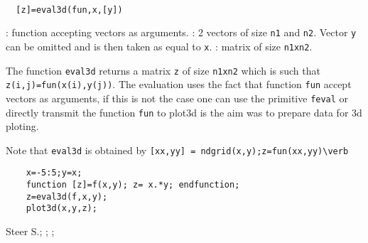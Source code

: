 \begin{mandesc}
  \\
\end{mandesc}
\begin{calling_sequence}
\begin{verbatim}
  [z]=eval3d(fun,x,[y])
\end{verbatim}
\end{calling_sequence}
\begin{parameters}
  \begin{varlist}
    : function accepting vectors as arguments.
    : 2 vectors of size \verb!n1! and \verb!n2!. Vector \verb!y! can be omitted and
    is then taken as equal to \verb!x!.
    : matrix of size \verb!n1xn2!.
  \end{varlist}
\end{parameters}
\begin{mandescription}
  The function \verb!eval3d! returns a matrix \verb!z! of size \verb!n1xn2!
  which is such that \verb!z(i,j)=fun(x(i),y(j))!. The evaluation uses
  the fact that function \verb!fun! accept vectors as arguments, if this is not
  the case one can use the primitive \verb!feval! or directly transmit the function
  \verb!fun! to plot3d is the aim was to prepare data for 3d ploting.

  Note that \verb!eval3d! is obtained by \verb![xx,yy] = ndgrid(x,y);z=fun(xx,yy)\verb!
\end{mandescription}

\begin{examples}
  \begin{Verbatim}
    x=-5:5;y=x;
    function [z]=f(x,y); z= x.*y; endfunction;
    z=eval3d(f,x,y);
    plot3d(x,y,z);
  \end{Verbatim}
\end{examples}

\begin{manseealso}
\end{manseealso}


\begin{authors}
  Steer S.; ; ;

\end{authors}
